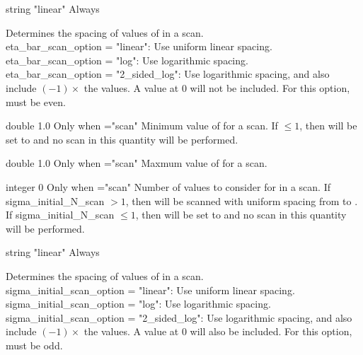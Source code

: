 \myhrule

{string}
{{\ttfamily "linear"}}
{Always}
{Determines the spacing of values of  in a scan.\\

{\ttfamily eta\_bar\_scan\_option} = {\ttfamily "linear"}: Use uniform linear spacing.\\

{\ttfamily eta\_bar\_scan\_option} = {\ttfamily "log"}: Use logarithmic spacing.\\

{\ttfamily eta\_bar\_scan\_option} = {\ttfamily "2\_sided\_log"}: Use logarithmic spacing, and also include $(-1)\times$ the values. A value at 0 will not be included. For this option,  must be even.

}

\myhrule

{double}
{1.0}
{Only when ={\ttfamily "scan"}}
{Minimum value of  for a scan. If $\le 1$, then  will be set to  and no scan in this quantity will be performed.
}

\myhrule

{double}
{1.0}
{Only when ={\ttfamily "scan"}}
{Maxmum value of  for a scan.
}

\myhrule

{integer}
{0}
{Only when ={\ttfamily "scan"}}
{Number of values to consider for  in a scan. If {\ttfamily sigma\_initial\_N\_scan} $>1$, then  will be scanned with uniform spacing from  to .
If {\ttfamily sigma\_initial\_N\_scan} $\le 1$, then  will be set to  and no scan in
this quantity will be performed.
}

\myhrule

{string}
{{\ttfamily "linear"}}
{Always}
{Determines the spacing of values of  in a scan.\\

{\ttfamily sigma\_initial\_scan\_option} = {\ttfamily "linear"}: Use uniform linear spacing.\\

{\ttfamily sigma\_initial\_scan\_option} = {\ttfamily "log"}: Use logarithmic spacing.\\

{\ttfamily sigma\_initial\_scan\_option} = {\ttfamily "2\_sided\_log"}: Use logarithmic spacing, and also include $(-1)\times$ the values. A value at 0 will also be included. For this option,  must be odd.

}


